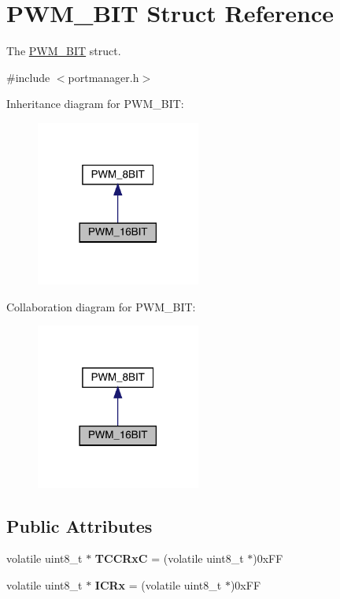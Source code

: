 \hypertarget{structPWM__16BIT}{}\section{P\+W\+M\+\_\+B\+IT Struct Reference}
\label{structPWM__16BIT}


The \mbox{\hyperlink{structPWM__16BIT}{P\+W\+M\+\_\+B\+IT}} struct.  




{\ttfamily \#include $<$portmanager.\+h$>$}



Inheritance diagram for P\+W\+M\+\_\+B\+IT\+:\nopagebreak
\begin{figure}[H]
\begin{center}
\leavevmode
\includegraphics[width=153pt]{structPWM__16BIT__inherit__graph}
\end{center}
\end{figure}


Collaboration diagram for P\+W\+M\+\_\+B\+IT\+:\nopagebreak
\begin{figure}[H]
\begin{center}
\leavevmode
\includegraphics[width=153pt]{structPWM__16BIT__coll__graph}
\end{center}
\end{figure}
\subsection*{Public Attributes}
\begin{DoxyCompactItemize}
\item 
\mbox{\label{structPWM__16BIT_aed58d52d5a361e85b19d584d9b59f1b9}} 
volatile uint8\+\_\+t $\ast$ {\bfseries T\+C\+C\+RxC} = (volatile uint8\+\_\+t $\ast$)0x\+FF
\item 
\mbox{\label{structPWM__16BIT_a6e5ea7c07d0fa0f6970bbfe9c2a11677}} 
volatile uint8\+\_\+t $\ast$ {\bfseries I\+C\+Rx} = (volatile uint8\+\_\+t $\ast$)0x\+FF
\end{DoxyCompactItemize}


